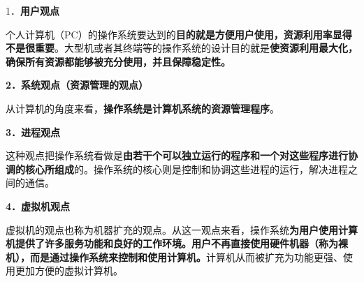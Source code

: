 {1．}\textbf{{用户观点}}

个人计算机（PC）的操作系统要达到的{\textbf{目的就是}}{\textbf{方便用户使用，资源利用率显得不是很重要}}。大型机或者其终端等的操作系统的{}设计目的就是{\textbf{使}}{\textbf{资源利用最大化，确保所有资源都能够被充分使用，并且保障稳定性}}\textbf{。}

{\textbf{2．系统观点（资源管理的观点）}}

从计算机的角度来看，\textbf{{操作系统是计算机系统的资源管理程序}}。

{\textbf{3．进程观点}}

这种观点把操作系统看做是\textbf{{由若干个可以独立运行的程序和一个对这些程序进行协调的核心所组成}}的。操作系统的核心则是控制和协调这些进程的运行，解决进程之间的通信。

\textbf{{4．虚拟机观点}}

虚拟机的观点也称为机器扩充的观点。从这一观点来看，操作系统{\textbf{为用户使用计算机提供了许多服务功能和良好的工作环境。}}{\textbf{用户不再直接使用硬件机器（称为裸机），而是通过操作系统来控制和使用计算机。}}计算机从而被扩充为功能更强、使用更加方便的虚拟计算机。
